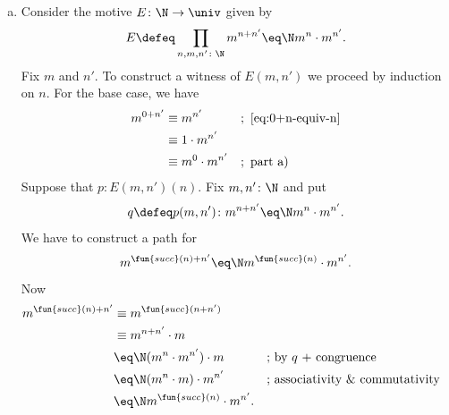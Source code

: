 \begin{solution}
\begin{enumerate}[a)]
\begin{enumerate}[1.]
            In the inductive step we assume $p\colon A(i)$ and must exhibit a witness of 
            \[
                (\fun{succ}(i)\cdot j)\cdot k
                    \eq\N\fun{succ}(i)\cdot(j\cdot k).
            \]
            For
            \begin{align*}
                (\fun{succ}(i)\cdot j)\cdot k
                    &\equiv (i\cdot j+j)\cdot k\\
                    &\eq\N (i\cdot j)\cdot k+j\cdot k
                        &&\text{; right distributivity}\\
                    &\eq\N i\cdot(j\cdot k)+j\cdot k
                        &&\text{; by }p\\
                    &\equiv\fun{succ}(i)\cdot(j\cdot k).
            \end{align*}
        \end{enumerate}

        \item Consider the motive $E\colon\N\to\univ$ given by
        \[
            E\defeq\prod_{n,m,n'\colon\N}m^{n+n'}\eq\N m^n\cdot m^{n'}.
        \]
        Fix $m$ and $n'$. To construct a witness of $E(m,n')$ we proceed by induction on $n$.
        For the base case, we have
        \begin{align*}
            m^{0+n'}&\equiv m^{n'} &&;\ \eqref{eq:0+n-equiv-n}\\
                &\equiv1\cdot m^{n'}\\
                &\equiv m^0\cdot m^{n'} &&;\ \text{part a)}
        \end{align*}
        Suppose that $p\colon E(m,n')(n)$. Fix $m,n'\colon\N$ and put
        \[
            q\defeq p(m,n')\colon m^{n+n'}\eq\N m^n\cdot m^{n'}.
        \]
        We have to construct a path for
        \[
            m^{\fun{succ}(n)+n'}\eq\N m^{\fun{succ}(n)}\cdot m^{n'}.
        \]
        Now
        \begin{align*}
            m^{\fun{succ}(n)+n'} &\equiv m^{\fun{succ}(n+n')}\\
                &\equiv m^{n+n'}\cdot m\\
                &\eq\N(m^n\cdot m^{n'})\cdot m
                    &&\text{; by $q$ + congruence}\\
                &\eq\N(m^n\cdot m)\cdot m^{n'}
                    &&\text{; associativity \& commutativity}\\
                &\eq\N m^{\fun{succ}(n)}\cdot m^{n'}.
        \end{align*}
    \end{enumerate}
\end{solution}

